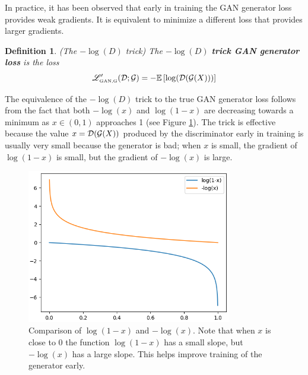 \documentclass{article}
\newtheorem{defn}{Definition}
\begin{document}
	In practice, it has been observed that early in training the GAN generator loss provides weak gradients. It is equivalent to minimize a different loss that provides larger gradients.
	\newcommand{\logdgangeneratorloss}{\mathscr{L}^{\prime}_{\textnormal{\tiny GAN,G}}}
	\begin{defn}\label{def:log_d_trick}\textnormal{(The \(-\log(D)\) trick)} 
		The \(-\log(D)\) \textbf{trick GAN generator loss} is the loss
		\begin{equation}\label{eq:log_d_trick}
			\logdgangeneratorloss(\discriminator; \generator) = -\expect\left[\log(\discriminator(\generator(X)))\right]
		\end{equation}
	\end{defn}
	The equivalence of the \(-\log(D)\) trick to the true GAN generator loss follows from the fact that both \(-\log(x)\) and \(\log(1-x)\) are decreasing towards a minimum as \(x \in (0,1)\) approaches 1 (see Figure \ref{fig:log_d_trick}). The trick is effective because the value \(x = \mathcal{D}(\mathcal{G}(X))\) produced by the discriminator early in training is usually very small because the generator is bad; when \(x\) is small, the gradient of \(\log(1-x)\) is small, but the gradient of \(-\log(x)\) is large.
	\begin{figure}
		\begin{center}
			\includegraphics[width=0.8\textwidth]{log_d_trick.png}
		\end{center}
		\caption{Comparison of \(\log(1-x)\) and \(-\log(x)\). Note that when \(x\) is close to 0 the function \(\log(1-x)\) has a small slope, but \(-\log(x)\) has a large slope. This helps improve training of the generator early.}\label{fig:log_d_trick}
	\end{figure}
	
\end{document}
